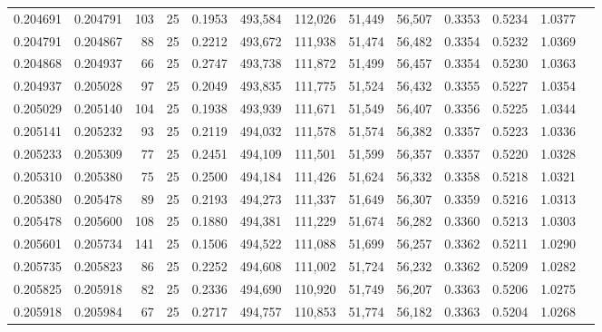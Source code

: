 \begin{tabular}{rrrrrrrrrrrrr}
0.204691 & 0.204791 &   103 &  25 &                                     0.1953 & 493,584 & 112,026 &  51,449 &  56,507 & 0.3353 & 0.5234 & 1.0377 \\
0.204791 & 0.204867 &    88 &  25 &                                     0.2212 & 493,672 & 111,938 &  51,474 &  56,482 & 0.3354 & 0.5232 & 1.0369 \\
0.204868 & 0.204937 &    66 &  25 &                                     0.2747 & 493,738 & 111,872 &  51,499 &  56,457 & 0.3354 & 0.5230 & 1.0363 \\
0.204937 & 0.205028 &    97 &  25 &                                     0.2049 & 493,835 & 111,775 &  51,524 &  56,432 & 0.3355 & 0.5227 & 1.0354 \\
0.205029 & 0.205140 &   104 &  25 &                                     0.1938 & 493,939 & 111,671 &  51,549 &  56,407 & 0.3356 & 0.5225 & 1.0344 \\
0.205141 & 0.205232 &    93 &  25 &                                     0.2119 & 494,032 & 111,578 &  51,574 &  56,382 & 0.3357 & 0.5223 & 1.0336 \\
0.205233 & 0.205309 &    77 &  25 &                                     0.2451 & 494,109 & 111,501 &  51,599 &  56,357 & 0.3357 & 0.5220 & 1.0328 \\
0.205310 & 0.205380 &    75 &  25 &                                     0.2500 & 494,184 & 111,426 &  51,624 &  56,332 & 0.3358 & 0.5218 & 1.0321 \\
0.205380 & 0.205478 &    89 &  25 &                                     0.2193 & 494,273 & 111,337 &  51,649 &  56,307 & 0.3359 & 0.5216 & 1.0313 \\
0.205478 & 0.205600 &   108 &  25 &                                     0.1880 & 494,381 & 111,229 &  51,674 &  56,282 & 0.3360 & 0.5213 & 1.0303 \\
0.205601 & 0.205734 &   141 &  25 &                                     0.1506 & 494,522 & 111,088 &  51,699 &  56,257 & 0.3362 & 0.5211 & 1.0290 \\
0.205735 & 0.205823 &    86 &  25 &                                     0.2252 & 494,608 & 111,002 &  51,724 &  56,232 & 0.3362 & 0.5209 & 1.0282 \\
0.205825 & 0.205918 &    82 &  25 &                                     0.2336 & 494,690 & 110,920 &  51,749 &  56,207 & 0.3363 & 0.5206 & 1.0275 \\
0.205918 & 0.205984 &    67 &  25 &                                     0.2717 & 494,757 & 110,853 &  51,774 &  56,182 & 0.3363 & 0.5204 & 1.0268 \\

\end{tabular}
